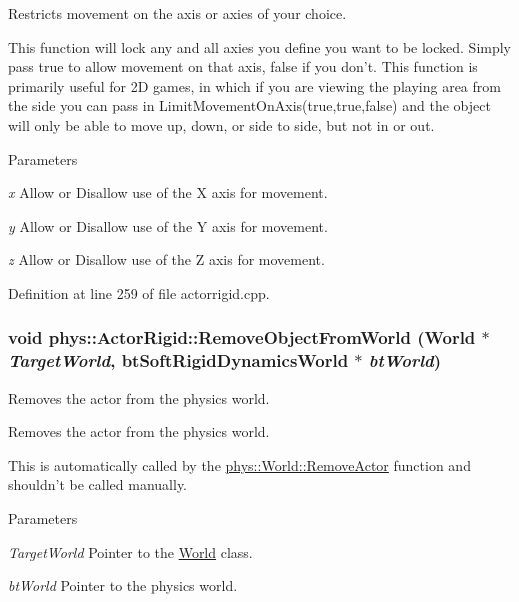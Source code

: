 Restricts movement on the axis or axies of your choice. 

This function will lock any and all axies you define you want to be locked. Simply pass true to allow movement on that axis, false if you don't. This function is primarily useful for 2D games, in which if you are viewing the playing area from the side you can pass in LimitMovementOnAxis(true,true,false) and the object will only be able to move up, down, or side to side, but not in or out. 
\begin{DoxyParams}{Parameters}
\item[{\em x}]Allow or Disallow use of the X axis for movement. \item[{\em y}]Allow or Disallow use of the Y axis for movement. \item[{\em z}]Allow or Disallow use of the Z axis for movement. \end{DoxyParams}


Definition at line 259 of file actorrigid.cpp.

\hypertarget{classphys_1_1ActorRigid_a74a4eaa5491b90a977e9db0457271f31}{
\subsubsection[{RemoveObjectFromWorld}]{\setlength{\rightskip}{0pt plus 5cm}void phys::ActorRigid::RemoveObjectFromWorld ({\bf World} $\ast$ {\em TargetWorld}, \/  btSoftRigidDynamicsWorld $\ast$ {\em btWorld})}}
\label{d8/d71/classphys_1_1ActorRigid_a74a4eaa5491b90a977e9db0457271f31}


Removes the actor from the physics world. 

Removes the actor from the physics world. \par
 This is automatically called by the \hyperlink{classphys_1_1World_ab00f84983afcc7f6ef1e5a84367d994d}{phys::World::RemoveActor} function and shouldn't be called manually. 
\begin{DoxyParams}{Parameters}
\item[{\em TargetWorld}]Pointer to the \hyperlink{classphys_1_1World}{World} class. \item[{\em btWorld}]Pointer to the physics world. \end{DoxyParams}


